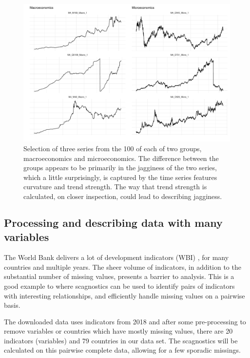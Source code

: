 \begin{Schunk}
\begin{figure}
\includegraphics[width=1\linewidth]{mason-lee-laa-cook_files/figure-latex/tsplots-1} \caption[Selection of three series from the 100 of each of two groups, macroeconomics and microeconomics]{Selection of three series from the 100 of each of two groups, macroeconomics and microeconomics. The difference between the groups appears to be primarily in the jagginess of the two series, which a little surprisingly, is captured by the time series features curvature and trend strength. The way that trend strength is calculated, on closer inspection, could lead to describing jagginess.}\label{fig:tsplots}
\end{figure}
\end{Schunk}

\hypertarget{processing-and-describing-data-with-many-variables}{%
\subsection{Processing and describing data with many
variables}\label{processing-and-describing-data-with-many-variables}}

The World Bank delivers a lot of development indicators (WBI)
\citep{WBI}, for many countries and multiple years. The sheer volume of
indicators, in addition to the substantial number of missing values,
presents a barrier to analysis. This is a good example to where
scagnostics can be used to identify pairs of indicators with interesting
relationships, and efficiently handle missing values on a pairwise
basis.

The downloaded data uses indicators from 2018 and after some
pre-processing to remove variables or countries which have mostly
missing values, there are 20 indicators (variables) and 79 countries in
our data set. The scagnostics will be calculated on this pairwise
complete data, allowing for a few sporadic missings.

